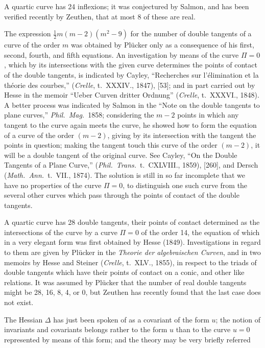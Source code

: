 \documentclass[12pt,a4paper,oneside]{book}
\begin{document}
A quartic curve has 24 inflexions; it was conjectured by Salmon, and has been verified recently by Zeuthen, that at most 8 of these are real.

The expression $\tfrac{1}{2}m(m-2)(m^{2}-9)$ for the number of double tangents of a curve of the order $m$ was obtained by Pl\"ucker only as a consequence of his first, second, fourth, and fifth equations. An investigation by means of the curve $\Pi=0$, which by its intersections with the given curve determines the points of contact of the double tangents, is indicated by Cayley, ``Recherches sur l'\'elimination et la th\'eorie des courbes,'' (\textit{Crelle}, t.~XXXIV., 1847), [53]; and in part carried out by Hesse in the memoir ``Ueber Curven dritter Ordnung'' (\textit{Crelle}, t.~XXXVI., 1848). A better process was indicated by Salmon in the ``Note on the double tangents to plane curves,'' \textit{Phil.\ Mag.}\ 1858; considering the $m-2$ points in which any tangent to the curve again meets the curve, he showed how to form the equation of a curve of the order $(m-2)$, giving by its intersection with the tangent the points in question; making the tangent touch this curve of the order $(m-2)$, it will be a double tangent of the original curve. See Cayley, ``On the Double Tangents of a Plane Curve,'' (\textit{Phil.\ Trans.}\ t.~CXLVIII., 1859), [260], and Dersch (\textit{Math.\ Ann.}\ t.~VII., 1874). The solution is still in so far incomplete that we have no properties of the curve $\Pi=0$, to distinguish one such curve from the several other curves which pass through the points of contact of the double tangents.

A quartic curve has 28 double tangents, their points of contact determined as the intersections of the curve by a curve $\Pi=0$ of the order 14, the equation of which in a very elegant form was first obtained by Hesse (1849). Investigations in regard to them are given by Pl\"ucker in the \textit{Theorie der algebraischen Curven}, and in two memoirs by Hesse and Steiner (\textit{Crelle}, t.~XLV., 1855), in respect to the triads of double tangents which have their points of contact on a conic, and other like relations. It was assumed by Pl\"ucker that the number of real double tangents might be 28, 16, 8, 4, or 0, but Zeuthen has recently found that the last case does not exist.

The Hessian $\Delta$ has just been spoken of as a covariant of the form $u$; the notion of invariants and covariants belongs rather to the form $u$ than to the curve $u=0$ represented by means of this form; and the theory may be very briefly referred
\end{document}
